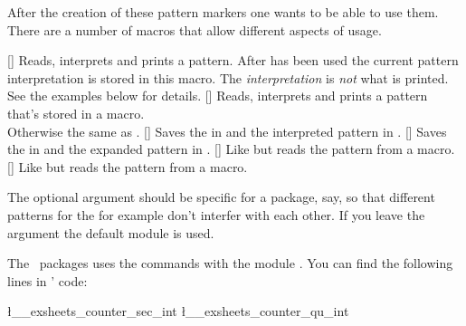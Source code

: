 \documentclass[load-preamble+]{cnltx-doc}
\def\at{\cnltxat}
\begin{document}
After the creation of these pattern markers one wants to be able to use them.
There are a number of macros that allow different aspects of usage.
\begin{commands}
  []
    Reads, interprets and prints a pattern.
  \expandable\command{\at cntfmts\at parsed\at pattern}
    After  has been used the current pattern
    interpretation is stored in this macro.  The \emph{interpretation} is
    \emph{not} what is printed.  See the examples below for details.
  []
    Reads, interprets and prints a pattern that's stored in a macro.\\
    Otherwise the same as .
  []
    Saves the  in  and the interpreted pattern in
    .
  []
    Saves the  in  and the expanded pattern in
    .
  []
    Like  but reads the pattern from a macro.
  []
    Like  but reads the pattern from a macro.
\end{commands}

The optional argument  should be specific for a package, say, so
that different patterns for the  for example don't interfer with
each other.  If you leave the argument the default module  is
used.

The \ExSheets\ packages uses the commands with the module .
You can find the following lines in \ExSheets' code:
\begin{sourcecode}
   \l__exsheets_counter_sec_int
   \l__exsheets_counter_qu_int
\end{sourcecode}
\end{document}
